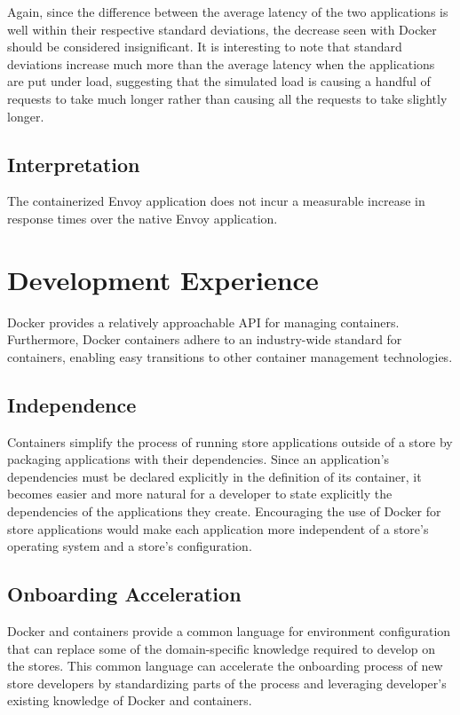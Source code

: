 \documentclass{article}
\begin{document}
Again, since the difference between the average latency of the two applications is well within their respective standard deviations, the decrease seen with Docker should be considered insignificant. It is interesting to note that standard deviations increase much more than the average latency when the applications are put under load, suggesting that the simulated load is causing a handful of requests to take much longer rather than causing all the requests to take slightly longer.

\subsection{Interpretation}
The containerized Envoy application does not incur a measurable increase in response times over the native Envoy application.

\section{Development Experience}
Docker provides a relatively approachable API for managing containers. Furthermore, Docker containers adhere to an industry-wide standard for containers, enabling easy transitions to other container management technologies.

\subsection{Independence}
Containers simplify the process of running store applications outside of a store by packaging applications with their dependencies. Since an application's dependencies must be declared explicitly in the definition of its container, it becomes easier and more natural for a developer to state explicitly the dependencies of the applications they create. Encouraging the use of Docker for store applications would make each application more independent of a store's operating system and a store's configuration.

\subsection{Onboarding Acceleration}
Docker and containers provide a common language for environment configuration that can replace some of the domain-specific knowledge required to develop on the stores. This common language can accelerate the onboarding process of new store developers by standardizing parts of the process and leveraging developer's existing knowledge of Docker and containers.
\end{document}
